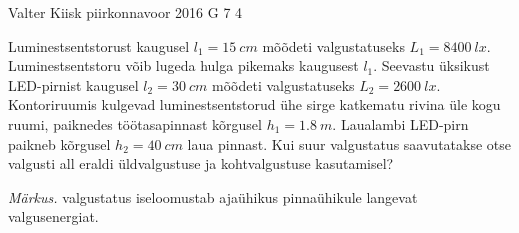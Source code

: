 \documentclass[11pt]{article}
\begin{document}
{%
{Valter Kiisk} %
{piirkonnavoor} %
{2016} %
{G 7} %
{4} %
{
\ifStatement
Luminestsentstorust kaugusel $l_1=\SI{15}{cm}$ mõõdeti valgustatuseks $L_1=\SI{8400}{lx}$. Luminestsentstoru võib lugeda hulga pikemaks kaugusest $l_1$. Seevastu üksikust LED-pirnist kaugusel $l_2=\SI{30}{cm}$ mõõdeti valgustatuseks $L_2=\SI{2600}{lx}$. Kontoriruumis kulgevad luminestsentstorud ühe sirge katkematu rivina üle kogu ruumi, paiknedes töötasapinnast kõrgusel $h_1=\SI{1.8}{m}$. Laualambi LED-pirn paikneb kõrgusel $h_2=\SI{40}{cm}$ laua pinnast. Kui suur valgustatus saavutatakse otse valgusti all eraldi üldvalgustuse ja kohtvalgustuse kasutamisel? 

\emph{Märkus.} valgustatus iseloomustab ajaühikus pinnaühikule langevat valgusenergiat.
\fi
}

}
\end{document}
